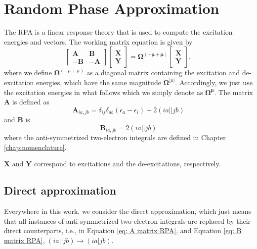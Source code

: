 \documentclass[12pt]{caltech_thesis}
\begin{document}
\section{Random Phase Approximation}
The RPA is a linear response theory that is used to compute the excitation energies and vectors. The working matrix equation is given by \autocite{dreuw_single-reference_2005}
\begin{equation}
\begin{bmatrix}
\textbf{A} & \textbf{B} \\
-\textbf{B} & -\textbf{A}
\end{bmatrix}
\begin{bmatrix}
\textbf{X} \\
\textbf{Y}
\end{bmatrix}
= \boldsymbol{\Omega ^{(-\mu + \mu)}}
\begin{bmatrix}
\textbf{X} \\
\textbf{Y}
\end{bmatrix}
,
\label{eq: RPA matrix equation}
\end{equation}
where we define $\boldsymbol{\Omega} ^{(-\mu + \mu)}$ as a diagonal matrix containing the excitation and de-excitation energies, which have the same magnitude $\boldsymbol{\Omega}^{|\mu|}$. Accordingly, we just use the excitation energies in what follows which we simply denote as $\boldsymbol{\Omega ^{\mu}}$. The matrix
$\textbf{A}$ is defined as
\begin{equation}
    \textbf{A}_{ia,jb} = \delta _{ij}\delta _{ab}(\epsilon _{a}- \epsilon _{i}) + 2(ia||jb)
\label{eq: A matrix RPA}
\end{equation}
and $\textbf{B}$ is
\begin{equation}
    \textbf{B}_{ia,jb} = 2(ia||jb)
\label{eq: B matrix RPA}
\end{equation}
where the anti-symmetrized two-electron integrals are defined in Chapter \ref{chap:nomenclature}.

$\textbf{X}$ and $\textbf{Y}$ correspond to excitations and the de-excitations, respectively.
\subsection{Direct approximation}
Everywhere in this work, we consider the direct approximation, which just means that all instances of anti-symmetrized two-electron integrals are replaced by their direct counterparts, i.e., in Equation \ref{eq: A matrix RPA}, and Equation \ref{eq: B matrix RPA}, $(ia||jb) \rightarrow (ia|jb)$.
\end{document}
